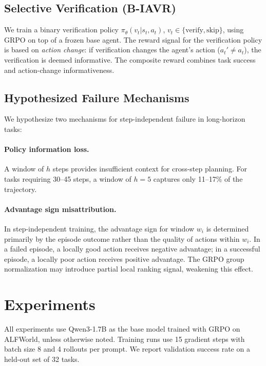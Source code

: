 \documentclass[11pt]{article}
\begin{document}
\subsection{Selective Verification (B-IAVR)}

We train a binary verification policy $\pi_\theta(v_t | s_t, a_t)$, $v_t \in \{\text{verify}, \text{skip}\}$, using GRPO on top of a frozen base agent.
The reward signal for the verification policy is based on \emph{action change}: if verification changes the agent's action ($a_t' \neq a_t$), the verification is deemed informative.
The composite reward combines task success and action-change informativeness.

\subsection{Hypothesized Failure Mechanisms}

We hypothesize two mechanisms for step-independent failure in long-horizon tasks:

\paragraph{Policy information loss.}
A window of $h$ steps provides insufficient context for cross-step planning.
For tasks requiring 30--45 steps, a window of $h{=}5$ captures only 11--17\% of the trajectory.

\paragraph{Advantage sign misattribution.}
In step-independent training, the advantage sign for window $w_i$ is determined primarily by the episode outcome rather than the quality of actions within $w_i$.
In a failed episode, a locally good action receives negative advantage; in a successful episode, a locally poor action receives positive advantage.
The GRPO group normalization may introduce partial local ranking signal, weakening this effect.


\section{Experiments}

All experiments use Qwen3-1.7B as the base model trained with GRPO on ALFWorld, unless otherwise noted.
Training runs use 15 gradient steps with batch size 8 and 4 rollouts per prompt.
We report validation success rate on a held-out set of 32 tasks.
\end{document}

